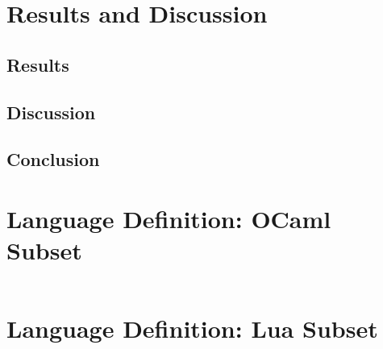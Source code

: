 \documentclass{kththesis}
\begin{document}
\chapter{Results and Discussion}

\section{Results}

\section{Discussion}

\section{Conclusion}

\printbibliography[heading=bibintoc]

\appendix

\chapter{Language Definition: OCaml Subset} \label{sec:appendix-ocaml}

\inputminted{text}{implementation/languages/ocaml/language}

\chapter{Language Definition: Lua Subset} \label{sec:appendix-lua}

\inputminted{text}{implementation/languages/lua/language}
\end{document}

